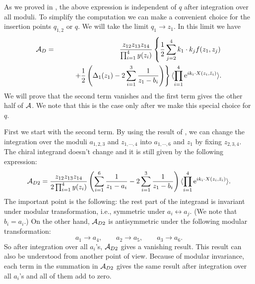 \documentclass[a4paper,12pt]{article}
\begin{document}
As we proved in \cite{IengoZhu2, IengoZhu3, Zhu}, the above
expression is independent of $q$ after integration over all
moduli. To simplify the computation we can make a convenient
choice for the insertion points $q_{1,2}$ or $q$.  We will take
the limit $q_1 \to z_1$. In this limit we have
\begin{eqnarray}
{\cal A}_D   & = &   {z_{12}z_{13}z_{14} \over \prod_{i=1}^4
y(z_i)} \left\{ {1\over 2} \sum_{ j=2}^4 k_1 \cdot k_j
 f(z_1,z_j) \right. \nonumber \\
 & &  \qquad \left.
 + { 1\over 2} \left( \Delta_1(z_1) - 2 \sum_{i=1}^3 { 1
\over z_1 - b_i}\right)  \right\} \langle \prod_{i=1}^4
\hbox{e}^{i k_i \cdot X(z_i, \bar z_i)} \rangle   . \label{eqad}
\end{eqnarray}
We will prove that the second term vanishes and the first term
gives the other half of ${\cal A}$. We note that this is the case
only after we make this special choice for $q$.

First we start with the second term. By using the result of
\cite{IengoZhu3}, we can change the integration over the moduli
$a_{1,2,3}$ and $z_{1,\cdots,4}$ into $a_{1,\cdots,6}$ and $z_1$
by fixing $z_{2,3,4}$. The chiral integrand doesn't change and it
is still given by the following expression:
\begin{equation}
{\cal A}_{D2}     =    {z_{12}z_{13}z_{14} \over 2 \prod_{i=1}^4
y(z_i)}  \left( \sum_{i=1}^6 {1\over z_1 - a_i}   - 2 \sum_{i=1}^3
{ 1 \over z_1 - b_i}\right)  \langle \prod_{i=1}^4 \hbox{e}^{i k_i
\cdot X(z_i, \bar z_i)} \rangle .
\end{equation}
The important point is the following: the rest part of the
integrand is invariant under modular transformation, i.e.,
symmetric under $a_i \leftrightarrow a_j$. (We note that $b_i =
a_i$.) On the other hand, ${\cal A}_{D2}$ is antisymmetric under
the following modular transformation:
\begin{equation}
a_1 \to a_4 , \qquad a_2 \to a_5 , \qquad a_3 \to a_6.
\end{equation}
So after integration over all $a_i$'s, ${\cal A}_{D2}$ gives a
vanishing result. This result can also be understood from another
point of view. Because of modular invariance, each term in the
summation in ${\cal A}_{D2}$ gives the same result after
integration over all $a_i$'s and all of them add to zero.
\end{document}
